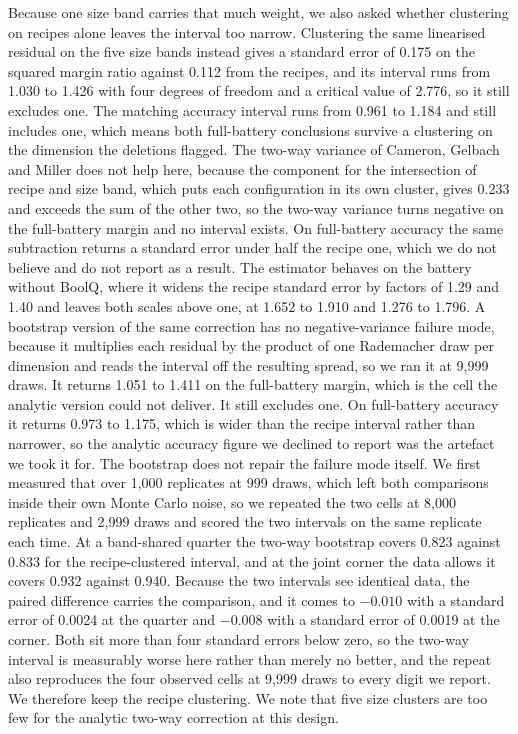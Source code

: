 Because one size band carries that much weight, we also asked whether clustering on recipes alone leaves the interval too narrow. Clustering the same linearised residual on the five size bands instead gives a standard error of 0.175 on the squared margin ratio against 0.112 from the recipes, and its interval runs from 1.030 to 1.426 with four degrees of freedom and a critical value of 2.776, so it still excludes one. The matching accuracy interval runs from 0.961 to 1.184 and still includes one, which means both full-battery conclusions survive a clustering on the dimension the deletions flagged. The two-way variance of Cameron, Gelbach and Miller does not help here, because the component for the intersection of recipe and size band, which puts each configuration in its own cluster, gives 0.233 and exceeds the sum of the other two, so the two-way variance turns negative on the full-battery margin and no interval exists. On full-battery accuracy the same subtraction returns a standard error under half the recipe one, which we do not believe and do not report as a result. The estimator behaves on the battery without BoolQ, where it widens the recipe standard error by factors of 1.29 and 1.40 and leaves both scales above one, at 1.652 to 1.910 and 1.276 to 1.796. A bootstrap version of the same correction has no negative-variance failure mode, because it multiplies each residual by the product of one Rademacher draw per dimension and reads the interval off the resulting spread, so we ran it at 9,999 draws. It returns 1.051 to 1.411 on the full-battery margin, which is the cell the analytic version could not deliver. It still excludes one. On full-battery accuracy it returns 0.973 to 1.175, which is wider than the recipe interval rather than narrower, so the analytic accuracy figure we declined to report was the artefact we took it for. The bootstrap does not repair the failure mode itself. We first measured that over 1,000 replicates at 999 draws, which left both comparisons inside their own Monte Carlo noise, so we repeated the two cells at 8,000 replicates and 2,999 draws and scored the two intervals on the same replicate each time. At a band-shared quarter the two-way bootstrap covers 0.823 against 0.833 for the recipe-clustered interval, and at the joint corner the data allows it covers 0.932 against 0.940. Because the two intervals see identical data, the paired difference carries the comparison, and it comes to $-0.010$ with a standard error of 0.0024 at the quarter and $-0.008$ with a standard error of 0.0019 at the corner. Both sit more than four standard errors below zero, so the two-way interval is measurably worse here rather than merely no better, and the repeat also reproduces the four observed cells at 9,999 draws to every digit we report. We therefore keep the recipe clustering. We note that five size clusters are too few for the analytic two-way correction at this design.


